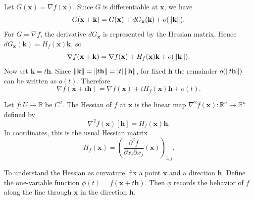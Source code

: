 \begin{pfbox}
Let $G(\mathbf{x})=\nabla f(\mathbf{x})$. Since $G$ is differentiable at
$\mathbf{x}$, we have
\[
    G(\mathbf{x}+\mathbf{k})
    =
    G(\mathbf{x})
    +
    dG_{\mathbf{x}}(\mathbf{k})
    +
    o(\left\lVert \mathbf{k} \right\rVert).
\]
For $G=\nabla f$, the derivative $dG_{\mathbf{x}}$ is represented by the Hessian
matrix. Hence $dG_{\mathbf{x}}(\mathbf{k})=H_f(\mathbf{x})\mathbf{k}$, so
\[
    \nabla f(\mathbf{x}+\mathbf{k})
    =
    \nabla f(\mathbf{x})
    +
    H_f(\mathbf{x})\mathbf{k}
    +
    o(\left\lVert \mathbf{k} \right\rVert).
\]
Now set $\mathbf{k}=t\mathbf{h}$. Since
$\left\lVert \mathbf{k} \right\rVert=\left\lVert t\mathbf{h} \right\rVert=|t|\left\lVert \mathbf{h} \right\rVert$, for fixed
$\mathbf{h}$ the remainder $o(\left\lVert t\mathbf{h} \right\rVert)$ can be written as $o(t)$.
Therefore
\[
    \nabla f(\mathbf{x}+t\mathbf{h})
    =
    \nabla f(\mathbf{x})
    +
    tH_f(\mathbf{x})\mathbf{h}
    +
    o(t).
\]
\end{pfbox}

\begin{definition}
Let $f:U\to\mathbb{R}$ be $C^2$. The Hessian of $f$ at $\mathbf{x}$ is the linear
map $\nabla^2 f(\mathbf{x}):\mathbb{R}^n\to\mathbb{R}^n$ defined by
\[
    \nabla^2 f(\mathbf{x})[\mathbf{h}]
    =
    H_f(\mathbf{x})\mathbf{h}.
\]
In coordinates, this is the usual Hessian matrix
\[
    H_f(\mathbf{x})
    =
    \left(
        \frac{\partial^2 f}{\partial x_i\partial x_j}(\mathbf{x})
    \right)_{i,j}.
\]
\end{definition}

To understand the Hessian as curvature, fix a point $\mathbf{x}$ and a direction
$\mathbf{h}$. Define the one-variable function $\phi(t)=f(\mathbf{x}+t\mathbf{h})$.
Then $\phi$ records the behavior of $f$ along the line through $\mathbf{x}$ in
the direction $\mathbf{h}$.

